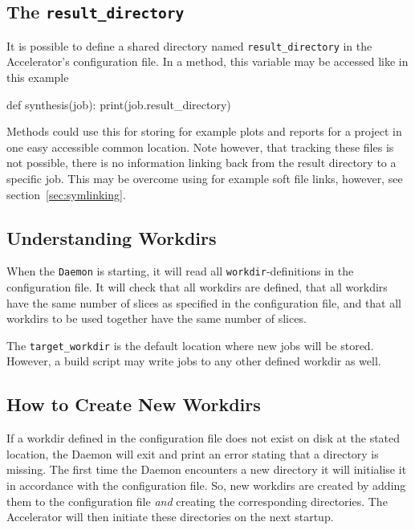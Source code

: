 \subsection{The \texttt{result\_directory}}
\label{sec:RESULT_DIR}

It is possible to define a shared directory
named \texttt{result\_directory} in the Accelerator's configuration
file.  In a method, this variable may be accessed like in this example
\begin{python}
def synthesis(job):
    print(job.result_directory)
\end{python}
Methods could use this for storing for example plots and reports for a
project in one easy accessible common location.  Note however, that
tracking these files is not possible, there is no information linking
back from the result directory to a specific job.  This may be
overcome using for example soft file links, however, see
section~\ref{sec:symlinking}.







\subsection{Understanding Workdirs}
When the \texttt{Daemon} is starting, it will read all
\texttt{workdir}-definitions in the configuration file.  It will check
that all workdirs are defined, that all workdirs have the same number
of slices as specified in the configuration file, and that all
workdirs to be used together have the same number of slices.

The \texttt{target\_workdir} is the default location where new jobs
will be stored.  However, a build script may write jobs to any other
defined workdir as well.

\subsection{How to Create New Workdirs}
If a workdir defined in the configuration file does not exist on disk
at the stated location, the Daemon will exit and print an error
stating that a directory is missing.  The first time the Daemon
encounters a new directory it will initialise it in accordance with
the configuration file.  So, new workdirs are created by adding them
to the configuration file \textsl{and} creating the corresponding
directories.  The Accelerator will then initiate these directories on
the next startup.












